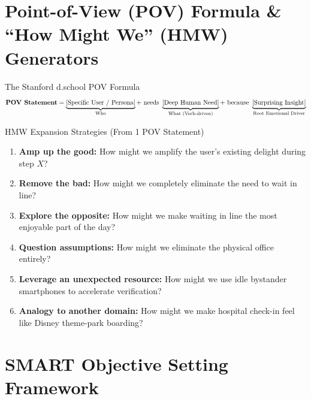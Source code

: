 \section{Point-of-View (POV) Formula \& ``How Might We'' (HMW) Generators}

\begin{metricbox}{The Stanford d.school POV Formula}
\[
\text{\textbf{POV Statement}} = \underbrace{[\text{Specific User / Persona}]}_{\text{Who}} + \text{ needs } \underbrace{[\text{Deep Human Need}]}_{\text{What (Verb-driven)}} + \text{ because } \underbrace{[\text{Surprising Insight}]}_{\text{Root Emotional Driver}}
\]
\end{metricbox}

\begin{frameworkbox}{HMW Expansion Strategies (From 1 POV Statement)}
\begin{enumerate}[label=\textbf{\arabic*.}, leftmargin=2em]
    \item \textbf{Amp up the good:} How might we amplify the user's existing delight during step $X$?
    \item \textbf{Remove the bad:} How might we completely eliminate the need to wait in line?
    \item \textbf{Explore the opposite:} How might we make waiting in line the most enjoyable part of the day?
    \item \textbf{Question assumptions:} How might we eliminate the physical office entirely?
    \item \textbf{Leverage an unexpected resource:} How might we use idle bystander smartphones to accelerate verification?
    \item \textbf{Analogy to another domain:} How might we make hospital check-in feel like Disney theme-park boarding?
\end{enumerate}
\end{frameworkbox}

\section{SMART Objective Setting Framework}

